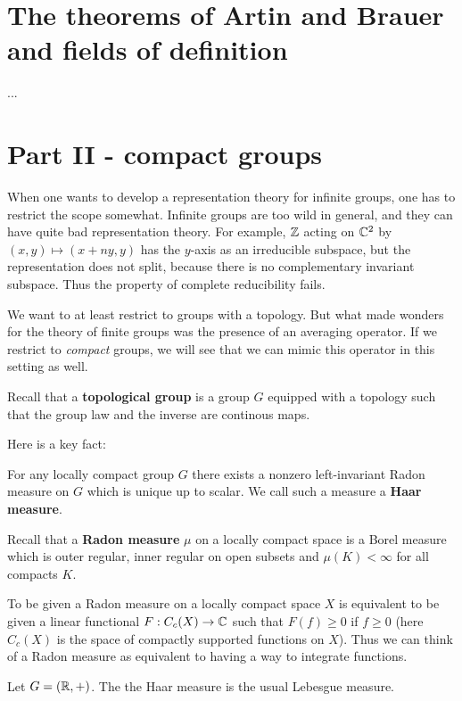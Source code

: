 \documentclass[11pt, english]{article}
\begin{document}
\section{The theorems of Artin and Brauer and fields of definition}

...

\section{Part II - compact groups}

When one wants to develop a representation theory for infinite groups, one has to restrict the scope somewhat. Infinite groups are too wild in general, and they can have quite bad representation theory. For example, $\mathbb{Z}$ acting on $\mathbb{C}^2$ by $(x,y) \mapsto (x+ny,y)$ has the $y$-axis as an irreducible subspace, but the representation does not split, because there is no complementary invariant subspace. Thus the property of complete reducibility fails. 

We want to at least restrict to groups with a topology. But what made wonders for the theory of finite groups was the presence of an averaging operator. If we restrict to \emph{compact} groups, we will see that we can mimic this operator in this setting as well.

Recall that a \textbf{topological group} is a group $G$ equipped with a topology such that the group law and the inverse are continous maps. 

Here is a key fact:
\begin{prop}
For any locally compact group $G$ there exists a nonzero left-invariant Radon measure on $G$ which is unique up to scalar. We call such a measure a \textbf{Haar measure}.  
\end{prop}

Recall that a \textbf{Radon measure} $\mu$ on a locally compact space is a Borel measure which is outer regular, inner regular on open subsets and $\mu(K) < \infty$ for all compacts $K$.

To be given a Radon measure on a locally compact space $X$ is equivalent to be given a linear functional $F:C_c(X) \to \mathbb{C}$ such that $F(f) \geq 0$ if $f \geq 0$ (here $C_c(X)$ is the space of compactly supported functions on $X$). Thus we can think of a Radon measure as equivalent to having a way to integrate functions.

\begin{example}
  Let $G=(\mathbb{R},+)$. The the Haar measure is the usual Lebesgue measure.
\end{example}
\end{document}
